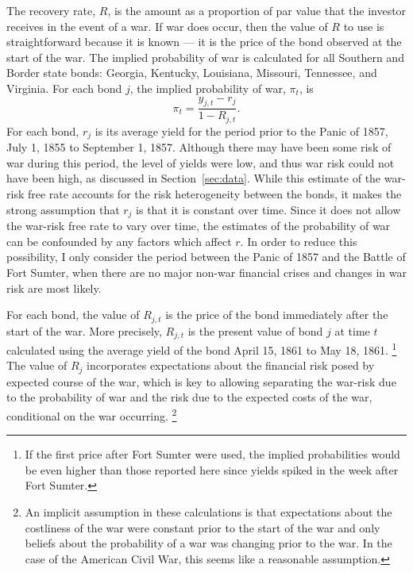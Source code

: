 \documentclass[]{article}\usepackage[]{graphicx}\usepackage[]{color}
\begin{document}
The recovery rate, $R$, is the amount as a proportion of par value that the investor receives in the event of a war.
If war does occur, then the value of $R$ to use is straightforward because it is known --- it is the price of the bond observed at the start of the war.
The implied probability of war is calculated for all Southern and Border state bonds: Georgia, Kentucky, Louisiana, Missouri, Tennessee, and Virginia.
For each bond $j$, the implied probability of war, $\pi_{t}$, is
\begin{equation}
  \pi_{t} = \frac{y_{j,t} - r_{j}}{1 - R_{j,t}} \text{.}
\end{equation}
For each bond, $r_{j}$ is its average yield for the period prior to the Panic of 1857, July  1, 1855 to September  1, 1857.
Although there may have been some risk of war during this period, the level of yields were low, and thus war risk could not have been high, as discussed in Section~\ref{sec:data}.
While this estimate of the war-risk free rate accounts for the risk heterogeneity between the bonds, it makes the strong assumption that $r_{j}$ is that it is constant over time.
Since it does not allow the war-risk free rate to vary over time, the estimates of the probability of war can be confounded by any factors which affect $r$.
In order to reduce this possibility, I only consider the period between the Panic of 1857 and the Battle of Fort Sumter, when there are no major non-war financial crises and changes in war risk are most likely.

For each bond, the value of $R_{j,t}$ is the price of the bond immediately after the start of the war.
More precisely, $R_{j,t}$ is the present value of bond $j$ at time $t$ calculated using the average yield of the bond April 15, 1861 to May 18, 1861.%
\footnote{
  If the first price after Fort Sumter were used, the implied probabilities would be even higher than those reported here since yields spiked in the week after Fort Sumter.
}
The value of $R_{j}$ incorporates expectations about the financial risk posed by expected course of the war, which is key to allowing separating the war-risk due to the probability of war and the risk due to the expected costs of the war, conditional on the war occurring.%
\footnote{
  An implicit assumption in these calculations is that expectations about the costliness of the war were constant prior to the start of the war and only beliefs about the probability of a war was changing prior to the war.
  In the case of the American Civil War, this seems like a reasonable assumption.
}
\end{document}

